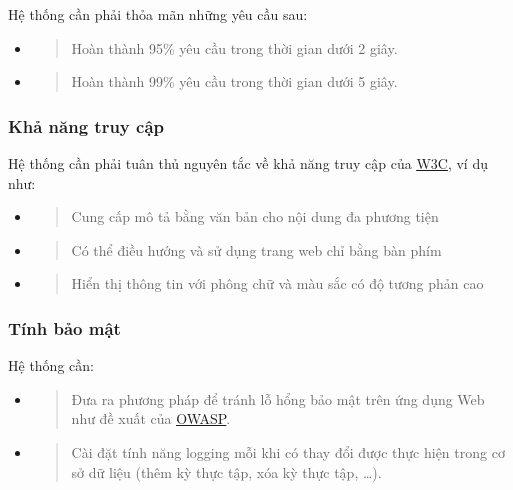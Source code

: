 \documentclass[./../main.tex]{subfiles}
\begin{document}
Hệ thống cần phải thỏa mãn những yêu cầu sau:

\begin{itemize}
\item
  \begin{quote}
  Hoàn thành 95\% yêu cầu trong thời gian dưới 2 giây.
  \end{quote}
\item
  \begin{quote}
  Hoàn thành 99\% yêu cầu trong thời gian dưới 5 giây.
  \end{quote}
\end{itemize}

\hypertarget{khux1ea3-nux103ng-truy-cux1eadp}{%
\subsubsection{Khả năng truy cập}\label{khux1ea3-nux103ng-truy-cux1eadp}}

Hệ thống cần phải tuân thủ nguyên tắc về khả năng truy cập của
\href{https://www.w3.org/WAI/fundamentals/accessibility-principles/}{\underline{W3C}},
ví dụ như:

\begin{itemize}
\item
  \begin{quote}
  Cung cấp mô tả bằng văn bản cho nội dung đa phương tiện
  \end{quote}
\item
  \begin{quote}
  Có thể điều hướng và sử dụng trang web chỉ bằng bàn phím
  \end{quote}
\item
  \begin{quote}
  Hiển thị thông tin với phông chữ và màu sắc có độ tương phản cao
  \end{quote}
\end{itemize}

\hypertarget{tuxednh-bux1ea3o-mux1eadt}{%
\subsubsection{Tính bảo mật}\label{tuxednh-bux1ea3o-mux1eadt}}

Hệ thống cần:

\begin{itemize}
\item
  \begin{quote}
  Đưa ra phương pháp để tránh lỗ hổng bảo mật trên ứng dụng Web như đề
  xuất của
  \href{https://owasp.org/www-project-top-ten/}{\underline{OWASP}}.
  \end{quote}
\item
  \begin{quote}
  Cài đặt tính năng logging mỗi khi có thay đổi được thực hiện trong cơ
  sở dữ liệu (thêm kỳ thực tập, xóa kỳ thực tập, \ldots).
  \end{quote}
\end{itemize}
\end{document}
